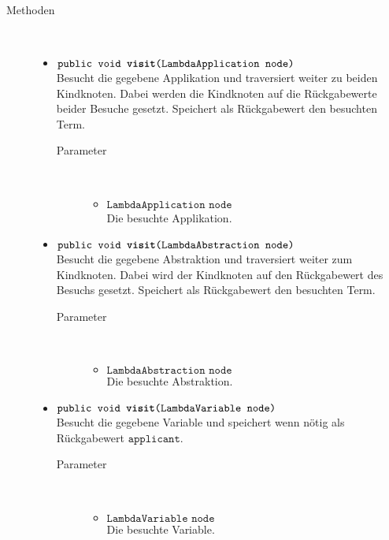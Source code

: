 \begin{description}
\item[Methoden] \hfill \\
	\vspace{-.8cm}
	\begin{itemize}
		\item $\texttt{public void \textbf{visit}(LambdaApplication node)}$ \\ Besucht die gegebene Applikation und traversiert weiter zu beiden Kindknoten. Dabei werden die Kindknoten auf die Rückgabewerte beider Besuche gesetzt. Speichert als Rückgabewert den besuchten Term.
		\begin{description}
			\item[Parameter] \hfill \\
			\vspace{-.8cm}
			\begin{itemize}
				\item $\texttt{LambdaApplication node}$ \\ Die besuchte Applikation.
			\end{itemize}
		\end{description}
		
		\item $\texttt{public void \textbf{visit}(LambdaAbstraction node)}$ \\ Besucht die gegebene Abstraktion und traversiert weiter zum Kindknoten. Dabei wird der Kindknoten auf den Rückgabewert des Besuchs gesetzt. Speichert als Rückgabewert den besuchten Term.
		\begin{description}
			\item[Parameter] \hfill \\
			\vspace{-.8cm}
			\begin{itemize}
				\item $\texttt{LambdaAbstraction node}$ \\ Die besuchte Abstraktion.
			\end{itemize}
		\end{description}
		
		\item $\texttt{public void \textbf{visit}(LambdaVariable node)}$ \\ Besucht die gegebene Variable und speichert wenn nötig als Rückgabewert $\texttt{applicant}$.
		\begin{description}
			\item[Parameter] \hfill \\
			\vspace{-.8cm}
			\begin{itemize}
				\item $\texttt{LambdaVariable node}$ \\ Die besuchte Variable.
			\end{itemize}
		\end{description}
		

\end{itemize}
\end{description}
